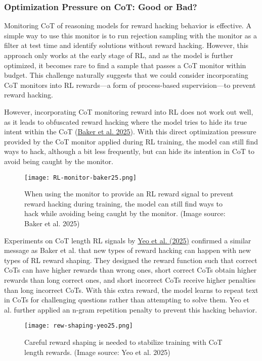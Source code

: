 \documentclass[12pt]{article}
\begin{document}
\subsubsection{Optimization Pressure on CoT: Good or Bad?}

Monitoring CoT of reasoning models for reward hacking behavior is effective. A simple way to use this monitor is to run rejection sampling with the monitor as a filter at test time and identify solutions without reward hacking. However, this approach only works at the early stage of RL, and as the model is further optimized, it becomes rare to find a sample that passes a CoT monitor within budget. This challenge naturally suggests that we could consider incorporating CoT monitors into RL rewards—a form of process-based supervision—to prevent reward hacking.

However, incorporating CoT monitoring reward into RL does not work out well, as it leads to obfuscated reward hacking where the model tries to hide its true intent within the CoT (\href{https://arxiv.org/abs/2503.11926}{Baker et al. 2025}). With this direct optimization pressure provided by the CoT monitor applied during RL training, the model can still find ways to hack, although a bit less frequently, but can hide its intention in CoT to avoid being caught by the monitor.

\begin{figure}[h]
    \centering
    \texttt{[image: RL-monitor-baker25.png]}
    \caption{When using the monitor to provide an RL reward signal to prevent reward hacking during training, the model can still find ways to hack while avoiding being caught by the monitor. (Image source: Baker et al. 2025)}
\end{figure}

Experiments on CoT length RL signals by \href{https://arxiv.org/abs/2502.03373}{Yeo et al. (2025)} confirmed a similar message as Baker et al. that new types of reward hacking can happen with new types of RL reward shaping. They designed the reward function such that correct CoTs can have higher rewards than wrong ones, short correct CoTs obtain higher rewards than long correct ones, and short incorrect CoTs receive higher penalties than long incorrect CoTs. With this extra reward, the model learns to repeat text in CoTs for challenging questions rather than attempting to solve them. Yeo et al. further applied an n-gram repetition penalty to prevent this hacking behavior.

\begin{figure}[h]
    \centering
    \texttt{[image: rew-shaping-yeo25.png]}
    \caption{Careful reward shaping is needed to stabilize training with CoT length rewards. (Image source: Yeo et al. 2025)}
\end{figure}
\end{document}
